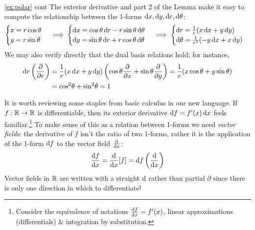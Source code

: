 \begin{example*}{\ref*{ex:polar} cont}{}
	The exterior derivative and part 2 of the Lemma make it easy to compute the relationship between the 1-forms $\dx,\dy,\dr,\dth$:
	\[
		\begin{cases}
			x=r\cos\theta\\
			y=r\sin\theta
		\end{cases}
		\implies 
		\begin{cases}
			\dx=\cos\theta\,\dr-r\sin\theta\,\dth\\
			\dy=\sin\theta\,\dr+r\cos\theta\,\dth
		\end{cases}
		\implies
		\begin{cases}
			\dr=\frac 1r(x\,\dx+y\,\dy)\\
			\dth=\frac 1{r^2}(-y\,\dx+x\,\dy)
		\end{cases}
	\]
	We may also verify directly that the dual basis relations hold; for instance,
	\begin{align*}
		\dr\left(\partials r\right) &=\frac 1r(x\,\dx+y\,\dy)\left(\cos\theta\partials x+\sin\theta\partials y\right) =\frac 1r(x\cos\theta+y\sin\theta)\\
		&=\cos^2\!\theta+\sin^2\!\theta=1
	\end{align*}
\end{example*}

\vfil\goodbreak




It is worth reviewing some staples from basic calculus in our new language.\smallbreak
If $f:\R\to\R$ is differentiable, then its exterior derivative $\df=f'(x)\,\dx$ feels familiar.\footnote{Consider the equivalence of notations $\diff[f]{x}=f'(x)$, linear approximations (differentials) \& integration by substitution.} To make sense of this as a relation between 1-forms we need \emph{vector fields}: the derivative of $f$ isn't the ratio of two 1-forms, rather it is the application of the 1-form $\df$ to the vector field $\diff x$:
\[
	\diff[f]{x}=\diff x[f]=\df\left(\diff x\right)
\]
Vector fields in $\R$ are written with a straight $\D$ rather than partial $\partial$ since there is only one direction in which to differentiate!\smallbreak

